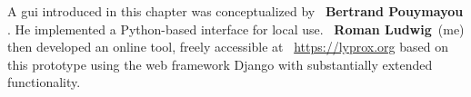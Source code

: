\begin{tcolorbox}[
    title=\faIcon{users} Contributions,
    parbox=false,
    float
]
    A \acrlong{gui} introduced in this chapter was conceptualized by ~\textbf{Bertrand Pouymayou} \cite{pouymayou_analysis_2019}. He implemented a Python-based interface for local use. ~\textbf{Roman Ludwig}~(me) then developed an online tool, freely accessible at ~\url{https://lyprox.org} based on this prototype using the web framework Django \cite{noauthor_django_2022} with substantially extended functionality.
\end{tcolorbox}
